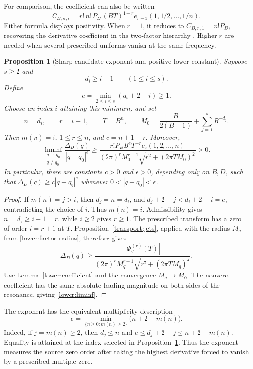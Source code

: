 \documentclass[11pt,letterpaper]{article}
\newtheorem{proposition}[theorem]{Proposition}
\theoremstyle{definition}
\theoremstyle{remark}
\begin{document}
For comparison, the coefficient can also be written
\[
 C_{B,n,r}
 =r!\,n!\,P_B\,(BT)^{1-r}
    e_{r-1}(1,1/2,\ldots,1/n).
\]
Either formula displays positivity.  When $r=1$, it reduces to
$C_{B,n,1}=n!P_B$, recovering the derivative coefficient in the
two-factor hierarchy \cite{repo-contact}.  Higher $r$ are needed when
several prescribed uniforms vanish at the same frequency.

\begin{proposition}[Sharp candidate exponent and positive lower constant]
\label{lower:main-bound}
Suppose $s\ge2$ and
\begin{equation}\label{lower:admissibility}
 d_i\ge i-1\qquad(1\le i\le s).
\end{equation}
Define
\begin{equation}\label{lower:exponent}
 e=\min_{2\le i\le s}(d_i+2-i)\ge1.
\end{equation}
Choose an index $i$ attaining this minimum, and set
\[
 n=d_i,\qquad r=i-1,\qquad T=B^n,
 \qquad
 M_0=\frac{B}{2(B-1)}+\sum_{j=1}^sB^{-d_j}.
\]
Then $m(n)=i$, $1\le r\le n$, and $e=n+1-r$.  Moreover,
\begin{equation}\label{lower:liminf}
 \liminf_{\substack{q\to q_0\\q\ne q_0}}
 \frac{\Delta_D(q)}{|q-q_0|^e}
 \ge
 \frac{r!P_BB^eT^{-r}e_e(1,2,\ldots,n)}
 {(2\pi)^rM_0^{r-1}\sqrt{r^2+(2\pi TM_0)^2}}
 >0.
\end{equation}
In particular, there are constants $c>0$ and $\epsilon>0$, depending
only on $B,D$, such that
$\Delta_D(q)\ge c|q-q_0|^e$ whenever $0<|q-q_0|<\epsilon$.
\end{proposition}

\begin{proof}
If $m(n)=j>i$, then $d_j=n=d_i$, and
$d_j+2-j<d_i+2-i=e$, contradicting the choice of $i$.  Thus $m(n)=i$.
Admissibility gives $n=d_i\ge i-1=r$, while $i\ge2$ gives $r\ge1$.
The prescribed transform has a zero of order $i=r+1$ at $T$.
Proposition~\ref{transport:jets}, applied with the radius $M_q$ from
\eqref{lower:factor-radius}, therefore gives
\[
 \Delta_D(q)
 \ge\frac{|\Phi_q^{(r)}(T)|}
 {(2\pi)^rM_q^{r-1}\sqrt{r^2+(2\pi TM_q)^2}}.
\]
Use Lemma~\ref{lower:coefficient} and the convergence $M_q\to M_0$.
The nonzero coefficient has the same absolute leading magnitude on
both sides of the resonance, giving \eqref{lower:liminf}.
\end{proof}

The exponent has the equivalent multiplicity description
\begin{equation}\label{lower:multiplicity-exponent}
 e=\min_{\{n\ge0:m(n)\ge2\}}\bigl(n+2-m(n)\bigr).
\end{equation}
Indeed, if $j=m(n)\ge2$, then $d_j\le n$ and
$e\le d_j+2-j\le n+2-m(n)$.  Equality is attained at the index selected
in Proposition~\ref{lower:main-bound}.  Thus the exponent measures the
source zero order after taking the highest derivative forced to vanish
by a prescribed multiple zero.
\end{document}
